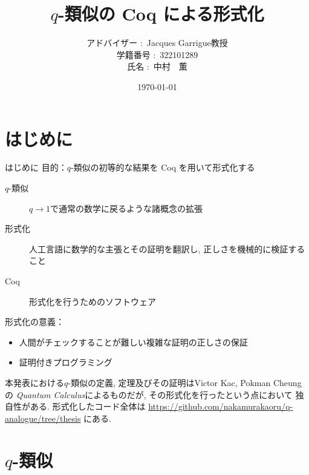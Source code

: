 \documentclass[dvipdfmx,cjk]{beamer}
\theoremstyle{mystyle}
\newcommand{\0}{\textbf{0}}
\begin{document}
\title{$q$-類似の Coq による形式化}
\author[中村　薫]{アドバイザー $\colon$ Jacques Garrigue教授\\
           学籍番号 $\colon$ 322101289\\
           氏名 $\colon$ 中村　薫}
\date{\today}
\maketitle
\begin{frame}
\tableofcontents
\end{frame}
\section{はじめに}

\begin{frame}
  \tableofcontents[currentsection] 
\end{frame}

\begin{frame}[fragile]{はじめに}
	目的：$q$-類似の初等的な結果を Coq を用いて形式化する \pause
 	\begin{description}
 		\item[$q$-類似] $q \to 1$で通常の数学に戻るような諸概念の拡張 \pause
		\item[形式化] 人工言語に数学的な主張とその証明を翻訳し, 
		正しさを機械的に検証すること \pause
		\item[Coq] 形式化を行うためのソフトウェア \pause
	\end{description}
	形式化の意義： \pause
	\begin{itemize}
		\item 人間がチェックすることが難しい複雑な証明の正しさの保証 \pause
		\item 証明付きプログラミング \pause
	\end{itemize}
	本発表における$q$-類似の定義, 定理及びその証明はVictor Kac, Pokman Cheungの
	{\it Quantum Calculus}\cite{Kac}によるものだが, その形式化を行ったという点において
	独自性がある. 形式化したコード全体は
	\url{https://github.com/nakamurakaoru/q-analogue/tree/thesis}\cite{coq qana}
	にある.
\end{frame}
\section{$q$-類似}
\end{document}
